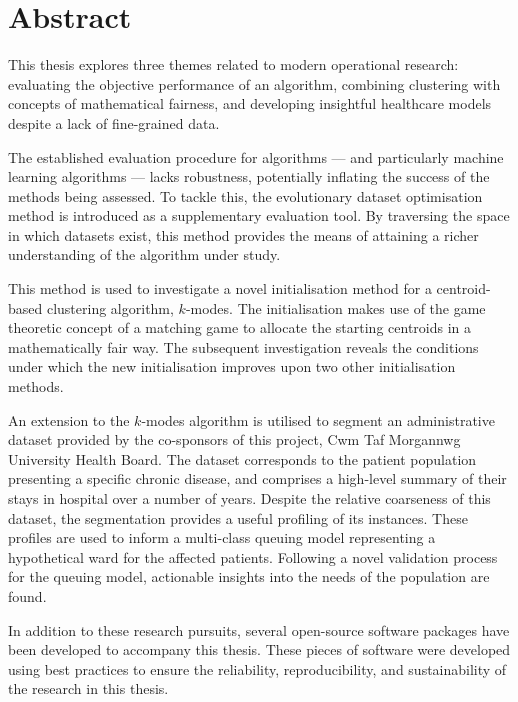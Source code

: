 \chapter*{Abstract}

This thesis explores three themes related to modern operational research:
evaluating the objective performance of an algorithm, combining clustering with
concepts of mathematical fairness, and developing insightful healthcare models
despite a lack of fine-grained data.

The established evaluation procedure for algorithms --- and particularly machine
learning algorithms --- lacks robustness, potentially inflating the success of
the methods being assessed. To tackle this, the evolutionary dataset
optimisation method is introduced as a supplementary evaluation tool. By
traversing the space in which datasets exist, this method provides the means of
attaining a richer understanding of the algorithm under study.

This method is used to investigate a novel initialisation method for a
centroid-based clustering algorithm, \(k\)-modes. The initialisation makes use
of the game theoretic concept of a matching game to allocate the starting
centroids in a mathematically fair way. The subsequent investigation reveals the
conditions under which the new initialisation improves upon two other
initialisation methods.

An extension to the \(k\)-modes algorithm is utilised to segment an
administrative dataset provided by the co-sponsors of this project, Cwm Taf
Morgannwg University Health Board. The dataset corresponds to the patient
population presenting a specific chronic disease, and comprises a high-level
summary of their stays in hospital over a number of years. Despite the relative
coarseness of this dataset, the segmentation provides a useful profiling of its
instances. These profiles are used to inform a multi-class queuing model
representing a hypothetical ward for the affected patients. Following a novel
validation process for the queuing model, actionable insights into the needs of
the population are found.

In addition to these research pursuits, several open-source software packages
have been developed to accompany this thesis. These pieces of software were
developed using best practices to ensure the reliability, reproducibility, and
sustainability of the research in this thesis.
